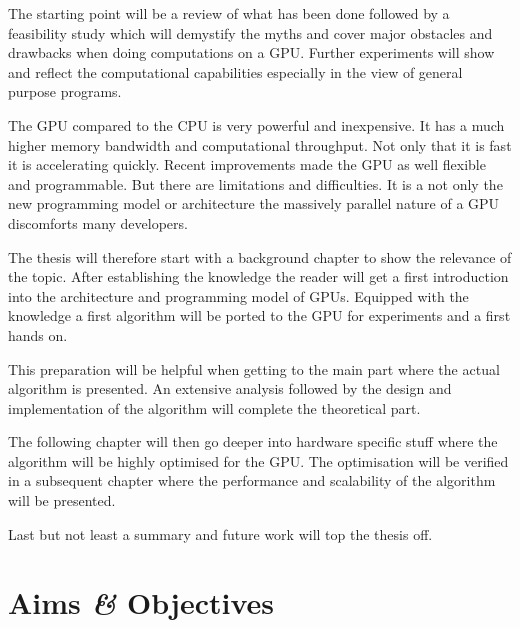 
The starting point will be a review of what has been done followed by a
feasibility study which will demystify the myths and cover major obstacles and
drawbacks when doing computations on a \gls{GPU}. Further experiments will show
and reflect the computational capabilities especially in the view of general 
purpose programs. 


The \gls{GPU} compared to the \gls{CPU} is very powerful and inexpensive. It has
a much higher memory bandwidth and computational throughput. Not only that it is
fast it is accelerating quickly. Recent improvements made the \gls{GPU} as well
flexible and programmable. But there are limitations and difficulties. It is a not
only the new programming model or architecture the massively parallel nature of 
a \gls{GPU} discomforts many developers. 


The thesis will therefore start with a background chapter to show the relevance
of the topic. After establishing the knowledge the reader will get a first
introduction into the architecture and programming model of \glspl{GPU}.
Equipped with the knowledge a first algorithm will be ported to the \gls{GPU}
for experiments and a first hands on.

This preparation will be helpful when getting to the main part where the actual
algorithm is presented. An extensive analysis followed by the design and implementation
of the algorithm will complete the theoretical part. 

The following chapter will then go deeper into hardware specific stuff where the
algorithm will be highly optimised for the \gls{GPU}. The optimisation will be 
verified in a subsequent chapter where the performance and scalability of the
algorithm will be presented. 

Last but not least a summary and future work will top the thesis off. 

\section{Aims \textit{\&} Objectives} %
\label{sec:aims_objectives}

